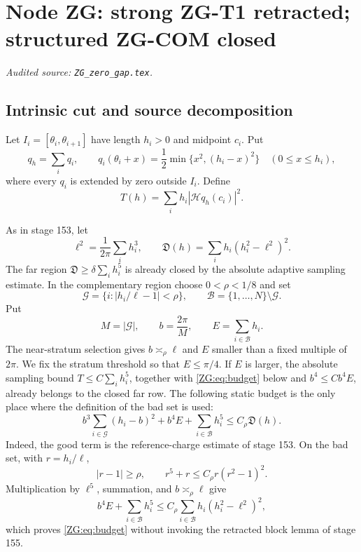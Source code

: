 \documentclass[11pt]{amsart}
\numberwithin{equation}{section}
\theoremstyle{definition}
\theoremstyle{remark}
\newcommand{\Hil}{\mathcal H}
\newcommand{\Dvar}{\mathfrak D}
\begin{document}
\begingroup
\section{Node ZG: strong ZG-T1 retracted; structured ZG-COM closed}
\label{module:ZG}
\noindent\textit{Audited source: \nolinkurl{ZG_zero_gap.tex}.}
\subsection{Intrinsic cut and source decomposition}

Let $I_i=[\theta_i,\theta_{i+1}]$ have length $h_i>0$ and midpoint
$c_i$.  Put
\begin{equation}\label{ZG:eq:q}
 q_h=\sum_iq_i,
 \qquad
 q_i(\theta_i+x)=\frac12\min\{x^2,(h_i-x)^2\}
 \quad(0\le x\le h_i),
\end{equation}
where every $q_i$ is extended by zero outside $I_i$.  Define
\begin{equation}\label{ZG:eq:T}
 T(h)=\sum_i h_i|\Hil q_h(c_i)|^2.
\end{equation}

As in stage 153, let
\begin{equation}\label{ZG:eq:D}
 \ell^2=\frac1{2\pi}\sum_i h_i^3,
 \qquad
 \Dvar(h)=\sum_i h_i(h_i^2-\ell^2)^2.
\end{equation}
The far region $\Dvar\ge\delta\sum_i h_i^5$ is already closed by the
absolute adaptive sampling estimate.  In the complementary region choose
$0<\rho<1/8$ and set
\begin{equation}\label{ZG:eq:GB}
 \mathcal G=\{i:|h_i/\ell-1|<\rho\},
 \qquad \mathcal B=\{1,\ldots,N\}\setminus\mathcal G.
\end{equation}
Put
\begin{equation}\label{ZG:eq:bE}
 M=|\mathcal G|,\qquad b=\frac{2\pi}{M},\qquad
 E=\sum_{i\in\mathcal B}h_i.
\end{equation}
The near-stratum selection gives $b\asymp_\rho\ell$ and $E$ smaller than
a fixed multiple of $2\pi$.  We fix the stratum threshold so that
$E\le\pi/4$.  If $E$ is larger, the absolute sampling bound
$T\le C\sum_i h_i^5$, together with \eqref{ZG:eq:budget} below and
$b^4\le Cb^4E$, already belongs to the closed far row.  The following
static budget is the only
place where the definition of the bad set is used:
\begin{equation}\label{ZG:eq:budget}
 b^3\sum_{i\in\mathcal G}(h_i-b)^2
 +b^4E+\sum_{i\in\mathcal B}h_i^5
 \le C_\rho\Dvar(h).
\end{equation}
Indeed, the good term is the reference-charge estimate of stage 153.
On the bad set, with $r=h_i/\ell$,
\[
 |r-1|\ge\rho,
 \qquad r^5+r\le C_\rho r(r^2-1)^2.
\]
Multiplication by $\ell^5$, summation, and $b\asymp_\rho\ell$ give
\[
 b^4E+\sum_{i\in\mathcal B}h_i^5
 \le C_\rho\sum_{i\in\mathcal B}
 h_i(h_i^2-\ell^2)^2,
\]
which proves \eqref{ZG:eq:budget} without invoking the retracted block
lemma of stage 155.
\end{document}
